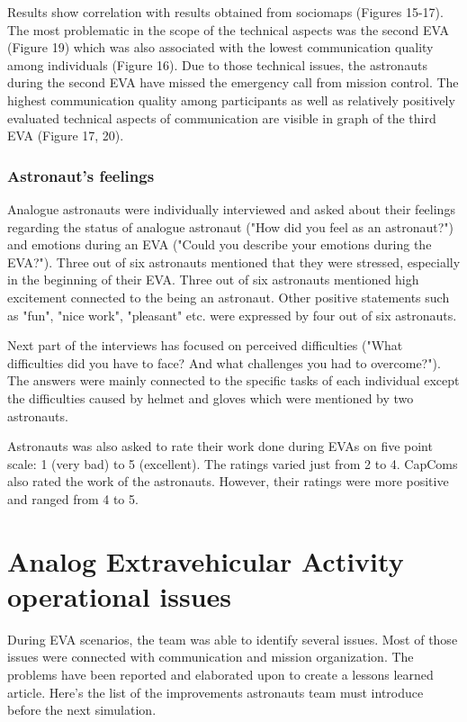 \documentclass[preprint]{elsarticle}
\begin{document}
Results show correlation with results obtained from sociomaps (Figures 15-17). The most problematic in the scope of the technical aspects was the second EVA (Figure 19) which was also associated with the lowest communication quality among individuals (Figure 16). Due to those technical issues, the astronauts during the second EVA have missed the emergency call from mission control. The highest communication quality among participants as well as relatively positively evaluated technical aspects of communication are visible in graph of the third EVA (Figure 17, 20).

\subsubsection{Astronaut's feelings}
Analogue astronauts were individually interviewed and asked about their feelings regarding the status of analogue astronaut ("How did you feel as an astronaut?") and emotions during an EVA ("Could you describe your emotions during the EVA?"). Three out of six astronauts mentioned that they were stressed, especially in the beginning of their EVA. Three out of six astronauts mentioned high excitement connected to the being an astronaut. Other positive statements such as "fun", "nice work", "pleasant" etc. were expressed by four out of six astronauts.

Next part of the interviews has focused on perceived difficulties ("What difficulties did you have to face? And what challenges you had to overcome?"). The answers were mainly connected to the specific tasks of each individual except the difficulties caused by helmet and gloves which were mentioned by two astronauts.

Astronauts was also asked to rate their work done during EVAs on five point scale: 1 (very bad) to 5 (excellent). The ratings varied just from 2 to 4. CapComs also rated the work of the astronauts. However, their ratings were more positive and ranged from 4 to 5.

\section{Analog Extravehicular Activity operational issues}
During EVA scenarios, the team was able to identify several issues. Most of those issues were connected with communication and mission organization. The problems have been reported and elaborated upon to create a lessons learned article. Here's the list of the improvements astronauts team must introduce before the next simulation.
\end{document}

